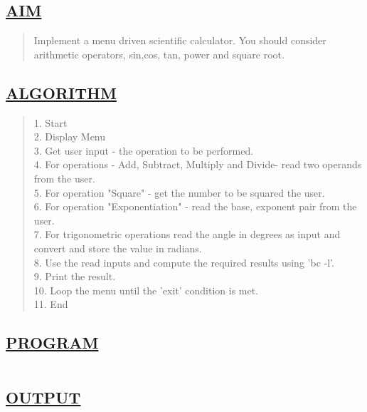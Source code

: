 \documentclass[a4paper, 12pt]{article}
\begin{document}
\subsection*{\underline{AIM}}
\begin{quote}
Implement a menu driven scientific calculator. You should consider arithmetic operators,
sin,cos, tan, power and square root.

\end{quote}

\subsection*{\underline{ALGORITHM}}
\begin{quote}
1. Start\\
2. Display Menu\\
3. Get user input - the operation to be performed.\\
4. For operations - Add, Subtract, Multiply and Divide- read two operands from the user.\\
5. For operation "Square" - get the number to be squared the user.\\
6. For operation "Exponentiation" - read the base, exponent pair from the user.\\
7. For trigonometric operations read the angle in degrees as input and convert and store the value in radians.\\
8. Use the read inputs and compute the required results using 'bc -l'.\\
9. Print the result.\\
10. Loop the menu until the 'exit' condition is met.\\
11. End\\
\end{quote}

\subsection*{\underline{PROGRAM}}
\begin{quote}
\inputminted[fontsize=\small,breaklines,breakanywhere]{sh}{shell1.sh}%
\end{quote}

\newpage

\subsection*{\underline{OUTPUT}}
\end{document}
